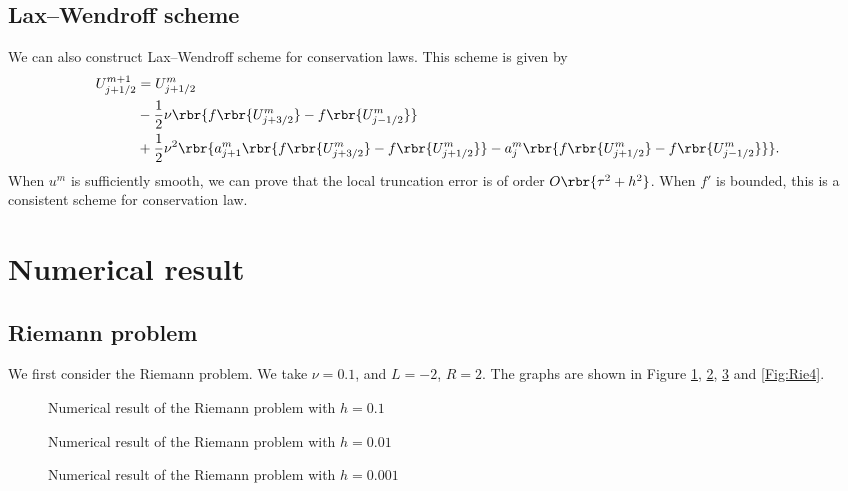 \documentclass[english, nochinese]{pnote}
\begin{document}
\subsection{Lax--Wendroff scheme}

We can also construct Lax--Wendroff scheme for conservation laws. This scheme is given by
\begin{equation}
\begin{split}
U_{ j + 1 / 2 }^{ m + 1 } &= U_{ j + 1 / 2 }^m \\
&- \frac{1}{2} \nu \rbr{ f \rbr{U_{ j + 3 / 2 }^m} - f \rbr{U_{ j - 1 / 2 }^m} } \\
&+ \frac{1}{2} \nu^2 \rbr{ a_{ j + 1 }^m \rbr{ f \rbr{U_{ j + 3 / 2 }^m} - f \rbr{U_{ j + 1 / 2 }^m} } - a_j^m \rbr{ f \rbr{U_{ j + 1 / 2 }^m} - f \rbr{U_{ j - 1 / 2 }^m} } }.
\end{split}
\end{equation}
When $u^m$ is sufficiently smooth, we can prove that the local truncation error is of order $ O \rbr{ \tau^2 + h^2 } $. When $f'$ is bounded, this is a consistent scheme for conservation law.

\section{Numerical result}

\subsection{Riemann problem}

We first consider the Riemann problem. We take $ \nu = 0.1 $, and $ L = -2 $, $ R = 2 $. The graphs are shown in Figure \ref{Fig:Rie1}, \ref{Fig:Rie2}, \ref{Fig:Rie3} and \ref{Fig:Rie4}.

\begin{figure}[htbp]
\centering
\scalebox{0.7}{}
\caption{Numerical result of the Riemann problem with $ h = 0.1 $}
\label{Fig:Rie1}
\end{figure}

\begin{figure}[htbp]
\centering
\scalebox{0.7}{}
\caption{Numerical result of the Riemann problem with $ h = 0.01 $}
\label{Fig:Rie2}
\end{figure}

\begin{figure}[htbp]
\centering
\scalebox{0.7}{}
\caption{Numerical result of the Riemann problem with $ h = 0.001 $}
\label{Fig:Rie3}
\end{figure}
\end{document}
